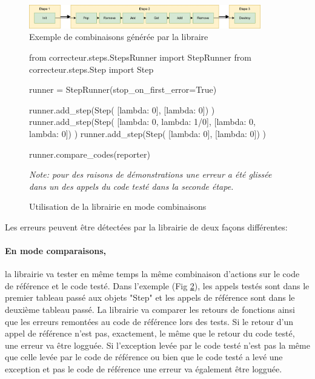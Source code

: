 \documentclass[a4paper]{report}
\begin{document}
\begin{figure}[ht]
	\begin{center}
		\includegraphics[width=0.9\textwidth]{img/combinator_exec.png} 
	\end{center}
	\caption{Exemple de combinaisons générée par la libraire}
	\label{fig:combinainaison_util_example}
\end{figure}

\begin{figure}[ht]
\begin{python}
from correcteur.steps.StepsRunner import StepRunner
from correcteur.steps.Step import Step

runner = StepRunner(stop_on_first_error=True)

runner.add_step(Step(
	[lambda: 0],
	[lambda: 0])
)
runner.add_step(Step(
	[lambda: 0, lambda: 1/0],
	[lambda: 0, lambda: 0])
)
runner.add_step(Step(
	[lambda: 0],
	[lambda: 0])
)

runner.compare_codes(reporter)
\end{python}
	\caption{Utilisation de la librairie en mode combinaisons}
	
	\textit{Note: pour des raisons de démonstrations une erreur a été glissée dans un des appels du code testé dans la seconde étape.}	
	
	\label{fig:combinaisons_ref}
\end{figure}


Les erreurs peuvent être détectées par la librairie de deux façons différentes:

\paragraph{En mode comparaisons,} la librairie va tester en même temps la même combinaison d'actions sur le code de référence et le code testé.
Dans l'exemple (Fig \ref{fig:combinaisons_ref}), les appels testés sont dans le premier tableau passé aux objets "Step" et les appels de référence sont dans le deuxième tableau passé.
La librairie va  comparer les retours de fonctions ainsi que les erreurs remontées au code de référence lors des tests.
Si le retour d'un appel de référence n'est pas, exactement, le même que le retour du code testé, une erreur va être logguée.
Si l'exception levée par le code testé n'est pas la même que celle levée par le code de référence ou bien que le code testé a levé une exception et pas le code de référence une erreur va également être logguée. 
\end{document}

